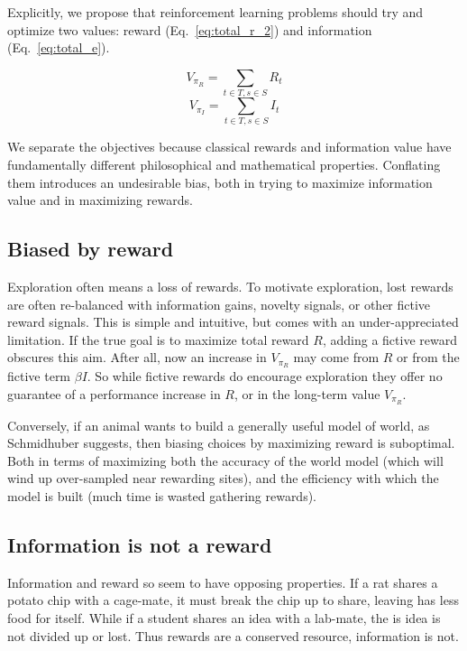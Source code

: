 \documentclass[9pt,twocolumn,twoside]{pnas-new}
\begin{document}
Explicitly, we propose that reinforcement learning problems should try and optimize two values: reward (Eq.~\ref{eq:total_r_2}) and information (Eq.~\ref{eq:total_e}). 

\begin{multicols}{2}
  \begin{equation}
    V_{\pi_R} = \sum_{t \in T, s \in S} R_t
    \label{eq:total_r_2}
  \end{equation} \break
  \begin{equation}
    V_{\pi_I} = \sum_{t \in T, s \in S} I_t
    \label{eq:total_e}
  \end{equation}
\end{multicols}

We separate the objectives because classical rewards and information value have fundamentally different philosophical and mathematical properties. Conflating them introduces an undesirable bias, both in trying to maximize information value and in maximizing rewards.

\subsection*{Biased by reward}
Exploration often means a loss of rewards. To motivate exploration, lost rewards are often re-balanced with information gains, novelty signals, or other fictive reward signals. This is simple and intuitive, but comes with an under-appreciated limitation. If the true goal is to maximize total reward $R$, adding a fictive reward obscures this aim. After all, now an increase in $V_{\pi_R}$ may come from $R$ or from the fictive term $\beta I$. So while fictive rewards do encourage exploration they offer no guarantee of a performance increase in $R$, or in the long-term value $V_{\pi_R}$. 

Conversely, if an animal wants to build a generally useful model of world, as Schmidhuber suggests, then biasing choices by maximizing reward is suboptimal. Both in terms of maximizing both the accuracy of the world model (which will wind up over-sampled near rewarding sites), and the efficiency with which the model is built (much time is wasted gathering rewards). 

\subsection*{Information is not a reward}
Information and reward so seem to have opposing properties. If a rat shares a potato chip with a cage-mate, it must break the chip up to share, leaving has less food for itself. While if a student shares an idea with a lab-mate, the is idea is not divided up or lost. Thus rewards are a conserved resource, information is not. 
\end{document}
